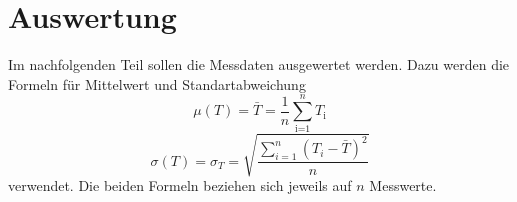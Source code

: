 \section{Auswertung}
\label{sec:Auswertung}
Im nachfolgenden Teil sollen die Messdaten ausgewertet werden. Dazu werden die Formeln für
Mittelwert und Standartabweichung
\begin{equation}
	\mu(T) = \bar{T}=\frac{1}{n}\sum_{\textrm{i=1}}^n T_\textrm{i}
    \label{eqn:mittelwert}
\end{equation}
\begin{equation}
	\sigma(T) = \sigma_T = \sqrt{\frac{\sum_{i=1}^{n}(T_i-\bar{T})^2}{n}}
    \label{eqn:standardabweichung}
\end{equation}
\noindent
verwendet. Die beiden Formeln beziehen sich jeweils auf $n$ Messwerte.

